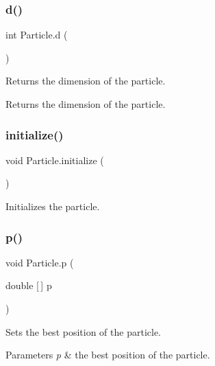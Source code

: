 \subsubsection{\texorpdfstring{d()}{d()}\hspace{0.1cm}{\footnotesize\ttfamily [2/2]}}
{\footnotesize\ttfamily int Particle.\+d (\begin{DoxyParamCaption}{ }\end{DoxyParamCaption})}

Returns the dimension of the particle. \begin{DoxyReturn}{Returns}
the dimension of the particle. 
\end{DoxyReturn}
\mbox{\label{class_particle_a99f82d52c6e3e0454db2607f768f8cb3}} 
\subsubsection{\texorpdfstring{initialize()}{initialize()}}
{\footnotesize\ttfamily void Particle.\+initialize (\begin{DoxyParamCaption}{ }\end{DoxyParamCaption})}

Initializes the particle. \mbox{\label{class_particle_af3cd850d81af82f5357492136c7679ab}} 
\subsubsection{\texorpdfstring{p()}{p()}\hspace{0.1cm}{\footnotesize\ttfamily [1/3]}}
{\footnotesize\ttfamily void Particle.\+p (\begin{DoxyParamCaption}\item[{double \mbox{[}$\,$\mbox{]}}]{p }\end{DoxyParamCaption})}

Sets the best position of the particle. 
\begin{DoxyParams}{Parameters}
{\em p} & the best position of the particle. \\
\hline
\end{DoxyParams}
\mbox{\label{class_particle_add309fe038f8b01ffd812fd574dfeed9}} 
